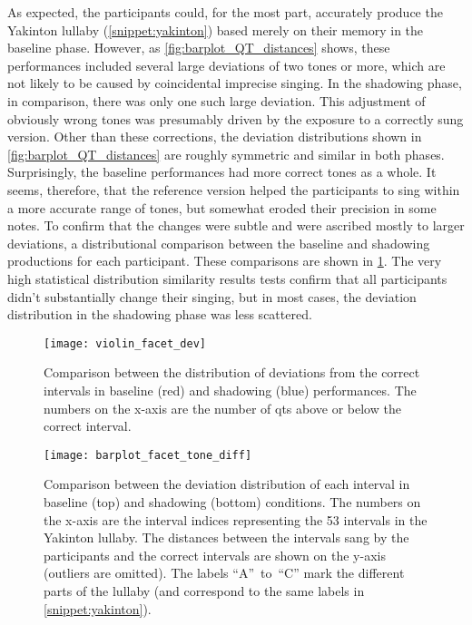 As expected, the participants could, for the most part, accurately produce the Yakinton lullaby (\cref{snippet:yakinton}) based merely on their memory in the baseline phase.
However, as \cref{fig:barplot_QT_distances} shows, these performances included several large deviations of two tones or more, which are not likely to be caused by coincidental imprecise singing.
In the shadowing phase, in comparison, there was only one such large deviation.
This adjustment of obviously wrong tones was presumably driven by the exposure to a correctly sung version.
Other than these corrections, the deviation distributions shown in \cref{fig:barplot_QT_distances} are roughly symmetric and similar in both phases.
Surprisingly, the baseline performances had more correct tones as a whole.
It seems, therefore, that the reference version helped the participants to sing within a more accurate range of tones, but somewhat eroded their precision in some notes.
To confirm that the changes were subtle and were ascribed mostly to larger deviations, a distributional comparison between the baseline and shadowing productions for each participant.
These comparisons are shown in \cref{fig:violin_facet_dev}.
The very high statistical distribution similarity results tests confirm that all participants didn't substantially change their singing, but in most cases, the deviation distribution in the shadowing phase was less scattered.
%
\begin{figure}[t!]
	\centering
	\texttt{[image: violin\_facet\_dev]}
	\caption[Summary of within-participant interval deviation distribution]
		{Comparison between the distribution of deviations from the correct intervals in baseline (red) and shadowing (blue) performances.
		The numbers on the x-axis are the number of \acp{qt} above or below the correct interval.}
	\label{fig:violin_facet_dev}
\end{figure}
%
\begin{figure}[t]
	\centering
	\texttt{[image: barplot\_facet\_tone\_diff]}
	\caption[Comparison of interval deviation between baseline and shadowing performances]
		{Comparison between the deviation distribution of each interval in baseline (top) and shadowing (bottom) conditions.
		The numbers on the x-axis are the interval indices representing the 53 intervals in the Yakinton lullaby.
		The distances between the intervals sang by the participants and the correct intervals are shown on the y-axis (outliers are omitted).
		The labels \enquote{A}~to~\enquote{C} mark the different parts of the lullaby (and correspond to the same labels in \cref{snippet:yakinton}).}
	\label{fig:barplot_facet_tone_diff}
\end{figure}
